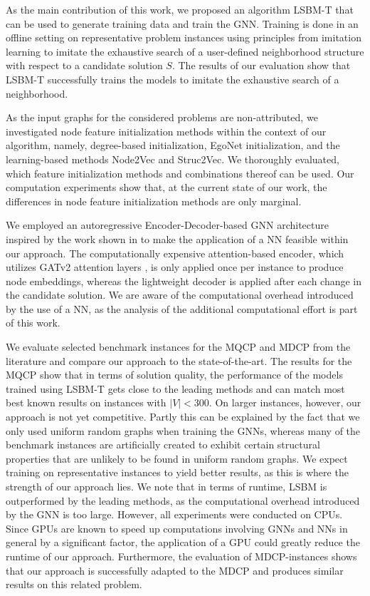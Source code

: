 \documentclass[draft,final]{vutinfth} %
\begin{document}
As the main contribution of this work, we proposed an algorithm LSBM-T that can be used to generate training data and train the GNN. Training is done in an offline setting on representative problem instances using principles from imitation learning to imitate the exhaustive search of a user-defined neighborhood structure with respect to a candidate solution $S$. The results of our evaluation show that LSBM-T successfully trains the models to imitate the exhaustive search of a neighborhood. 

As the input graphs for the considered problems are non-attributed, we investigated node feature initialization methods within the context of our algorithm, namely, degree-based initialization, EgoNet initialization, and the learning-based methods Node2Vec and Struc2Vec. 
We thoroughly evaluated, which feature initialization methods and combinations thereof can be used. Our computation experiments show that, at the current state of our work, the differences in node feature initialization methods are only marginal. 

We employed an autoregressive Encoder-Decoder-based GNN architecture inspired by the work shown in \cite{Kool2019} to make the application of a NN feasible within our approach. The computationally expensive attention-based encoder, which utilizes GATv2 attention layers \cite{Brody2021}, is only applied once per instance to produce node embeddings, whereas the lightweight decoder is applied after each change in the candidate solution. 
We are aware of the computational overhead introduced by the use of a NN, as the analysis of the additional computational effort is part of this work. 

We evaluate selected benchmark instances for the MQCP and MDCP from the literature and compare our approach to the state-of-the-art. The results for the MQCP show that 
in terms of solution quality, the performance of the models trained using LSBM-T gets close to the leading methods and can match most best known results on instances with $|V| < 300$. On larger instances, however, our approach is not yet competitive. Partly this can be explained by the fact that we only used uniform random graphs  when training the GNNs, whereas many of the benchmark instances are artificially created to exhibit certain structural properties that are unlikely to be found in uniform random graphs. We expect training on representative instances to yield better results, as this is where the strength of our approach lies. 
We note that in terms of runtime, LSBM is outperformed by the leading methods, as the computational overhead introduced by the GNN is too large. However, all experiments were conducted on CPUs. Since GPUs are known to speed up computations involving GNNs and NNs in general by a significant factor, the application of a GPU could greatly reduce the runtime of our approach. 
Furthermore, the evaluation of MDCP-instances shows that our approach is successfully adapted to the MDCP and produces similar results on this related problem. 
\end{document}
